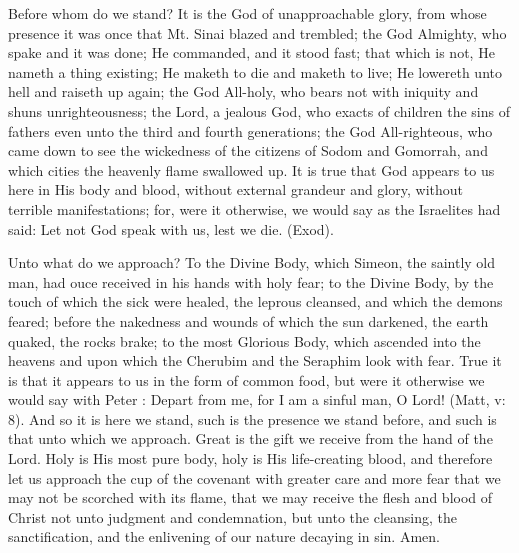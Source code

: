 Before whom do we stand? It is the God of 
unapproachable glory, from whose presence it 
was once that Mt. Sinai blazed and trembled; 
the God Almighty, who spake and it was done; 
He commanded, and it stood fast; that which is 
not, He nameth a thing existing; He maketh to 
die and maketh to live; He lowereth unto hell 
and raiseth up again; the God All-holy, who 
bears not with iniquity and shuns unrighteousness;
the Lord, a jealous God, who exacts of 
children the sins of fathers even unto the third 
and fourth generations; the God All-righteous, 
who came down to see the wickedness of the 
citizens of Sodom and Gomorrah, and which 
cities the heavenly flame swallowed up. It is 
true that God appears to us here in His body 
and blood, without external grandeur and glory, 
without terrible manifestations; for, were it 
otherwise, we would say as the Israelites had
said: Let not God speak with us, lest we die. 
(Exod). 

Unto what do we approach? To the Divine 
Body, which Simeon, the saintly old man, had 
ouce received in his hands with holy fear; to 
the Divine Body, by the touch of which the sick 
were healed, the leprous cleansed, and which 
the demons feared; before the nakedness and 
wounds of which the sun darkened, the earth 
quaked, the rocks brake; to the most Glorious 
Body, which ascended into the heavens and 
upon which the Cherubim and the Seraphim 
look with fear. True it is that it appears to us 
in the form of common food, but were it otherwise
we would say with Peter : Depart from me, 
for I am a sinful man, O Lord! (Matt, v: 8). 
And so it is here we stand, such is the presence 
we stand before, and such is that unto which we 
approach. Great is the gift we receive from the 
hand of the Lord. Holy is His most pure body, 
holy is His life-creating blood, and therefore let 
us approach the cup of the covenant with greater 
care and more fear that we may not be scorched 
with its flame, that we may receive the flesh and 
blood of Christ not unto judgment and condemnation,
but unto the cleansing, the sanctification,
and the enlivening of our nature decaying
in sin. Amen.

